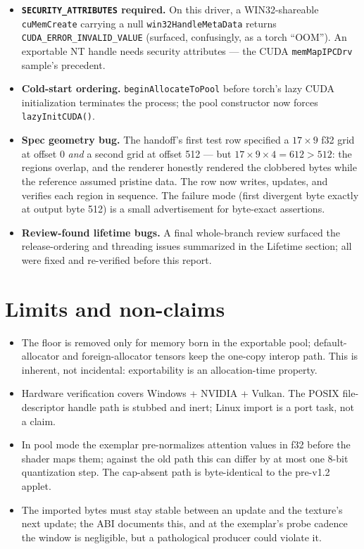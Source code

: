 \documentclass[11pt]{article}
\begin{document}
\begin{itemize}
  \item \textbf{\texttt{SECURITY\_ATTRIBUTES} required.} On this driver, a
        WIN32-shareable \texttt{cuMemCreate} carrying a null
        \texttt{win32HandleMetaData} returns
        \texttt{CUDA\_ERROR\_INVALID\_VALUE} (surfaced, confusingly, as a
        torch ``OOM''). An exportable NT handle needs security attributes
        --- the CUDA \texttt{memMapIPCDrv} sample's precedent.
  \item \textbf{Cold-start ordering.} \texttt{beginAllocateToPool} before
        torch's lazy CUDA initialization terminates the process; the pool
        constructor now forces \texttt{lazyInitCUDA()}.
  \item \textbf{Spec geometry bug.} The handoff's first test row specified a
        $17{\times}9$ f32 grid at offset 0 \emph{and} a second grid at
        offset 512 --- but $17{\times}9{\times}4 = 612 > 512$: the regions
        overlap, and the renderer honestly rendered the clobbered bytes
        while the reference assumed pristine data. The row now writes,
        updates, and verifies each region in sequence. The failure mode
        (first divergent byte exactly at output byte 512) is a small
        advertisement for byte-exact assertions.
  \item \textbf{Review-found lifetime bugs.} A final whole-branch review
        surfaced the release-ordering and threading issues summarized in
        the Lifetime section; all were fixed and re-verified before this
        report.
\end{itemize}

\section{Limits and non-claims}

\begin{itemize}
  \item The floor is removed only for memory born in the exportable pool;
        default-allocator and foreign-allocator tensors keep the one-copy
        interop path. This is inherent, not incidental: exportability is an
        allocation-time property.
  \item Hardware verification covers Windows + NVIDIA + Vulkan. The POSIX
        file-descriptor handle path is stubbed and inert; Linux import is a
        port task, not a claim.
  \item In pool mode the exemplar pre-normalizes attention values in f32
        before the shader maps them; against the old path this can differ by
        at most one 8-bit quantization step. The cap-absent path is
        byte-identical to the pre-v1.2 applet.
  \item The imported bytes must stay stable between an update and the
        texture's next update; the ABI documents this, and at the exemplar's
        probe cadence the window is negligible, but a pathological producer
        could violate it.
\end{itemize}
\end{document}
